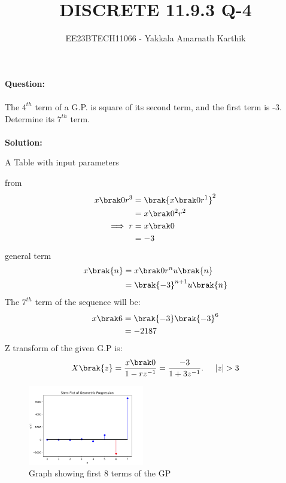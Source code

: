 \documentclass[journal,12pt,twocolumn]{IEEEtran}
\begin{document}


\title{DISCRETE 11.9.3 Q-4}
\author{EE23BTECH11066 - Yakkala Amarnath Karthik
}
\maketitle


\textbf{Question:} \\ \\The $4^{th}$ term of a G.P. is square of its second term, and the first term is -3. Determine its $7^{th}$ term.\\ \\
\textbf{Solution:}
\fi
\begin{table}[h!]
  \centering
  
  \caption{A Table with input parameters}
  \label{tab:11.9.3.4.1}
\end{table}
from 
\begin{align}
 x\brak0r^{3}&=\brak{x\brak0r^{1}}^2\\
 &=x\brak0^2r^2\\
\implies r&=x\brak0\\
&=-3
\end{align}
general term
\begin{align}
x\brak{n}&=x\brak0r^nu\brak{n}\\
&=\brak{-3}^{n+1}u\brak{n}
\end{align}
The $7^{th}$ term of the sequence will be:
\begin{align}
x\brak6 & =\brak{-3}\brak{-3}^{6}\\
& =-2187
\end{align}
Z transform of the given G.P is:
\begin{align}
X\brak{z}=\frac{x\brak0}{1-rz^{-1}}= \frac{-3}{1+3z^{-1}}.\hspace{0.5cm} |z|>3
\end{align}
\bigskip
\begin{figure}[ht]
        \centering
        \includegraphics[width=0.45\textwidth]{ncert-maths/11/9/3/4/figs/stemplotfinal.jpeg}
        \caption{Graph showing first 8 terms of the GP}
    \end{figure} \\
\end{document}
